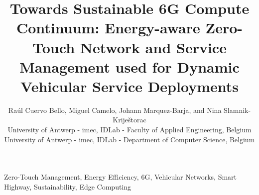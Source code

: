 \documentclass[conference]{IEEEtran}
\begin{document}
\frenchspacing
\renewcommand{\baselinestretch}{0.87}

\title{Towards Sustainable 6G Compute Continuum: Energy-aware Zero-Touch Network and Service Management used for Dynamic Vehicular Service Deployments}

\author{Raúl Cuervo Bello, Miguel Camelo, Johann Marquez-Barja, and Nina Slamnik-Kriještorac\\
     University of Antwerp - imec, IDLab - Faculty of Applied Engineering, Belgium \\ \quad{} University of Antwerp - imec, IDLab - Department of Computer Science, Belgium}

\maketitle



\begin{IEEEkeywords}
    Zero-Touch Management, Energy Efficiency, 6G, Vehicular Networks, Smart Highway, Sustainability, Edge Computing
\end{IEEEkeywords}
\glsresetall










\end{document}
